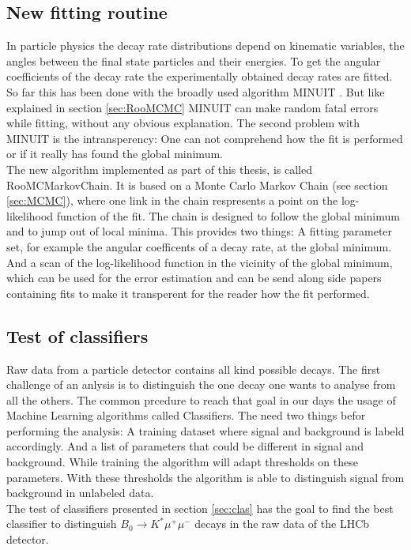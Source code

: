 \documentclass[english]{uzhpub}
\begin{document}
\subsection{New fitting routine}
In particle physics the decay rate distributions depend on kinematic variables, the angles between the final state particles and their energies. To get the angular coefficients of the decay rate the experimentally obtained decay rates are fitted.
So far this has been done with the broadly used algorithm MINUIT \cite{bib:Minuit}. But like explained in section \ref{sec:RooMCMC} MINUIT can make random fatal errors while fitting, without any obvious explanation. The second problem with MINUIT is the intransperency: One can not comprehend how the fit is performed or if it really has found the global minimum. \\
The new algorithm implemented as part of this thesis, is called RooMCMarkovChain. It is based on a Monte Carlo Markov Chain (see section \ref{sec:MCMC}), where one link in the chain respresents a point on the log-likelihood function of the fit. The chain is designed to follow the global minimum and to jump out of local minima. This provides two things: A fitting parameter set, for example the angular coefficents of a decay rate, at the global minimum. And a scan of the log-likelihood function in the vicinity of the global minimum, which can be used for the error estimation and can be send along side papers containing fits to make it transperent for the reader how the fit performed.

\subsection{Test of classifiers}
Raw data from a particle detector contains all kind possible decays. The first challenge of an anlysis is to distinguish the one decay one wants to analyse from all the others.
The common prcedure to reach that goal in our days the usage of Machine Learning algorithms called Classifiers. The need two things befor performing the analysis: A training dataset where signal and background is labeld accordingly. And a list of parameters that could be different in signal and background. While training the algorithm will adapt thresholds on these parameters. With these thresholds the algorithm is able to distinguish signal from background in unlabeled data. \\
The test of classifiers presented in section \ref{sec:clas} has the goal to find the best classifier to distinguish $B_0 \rightarrow K^* \mu^+ \mu^-$ decays in the raw data of the LHCb detector.
\end{document}

